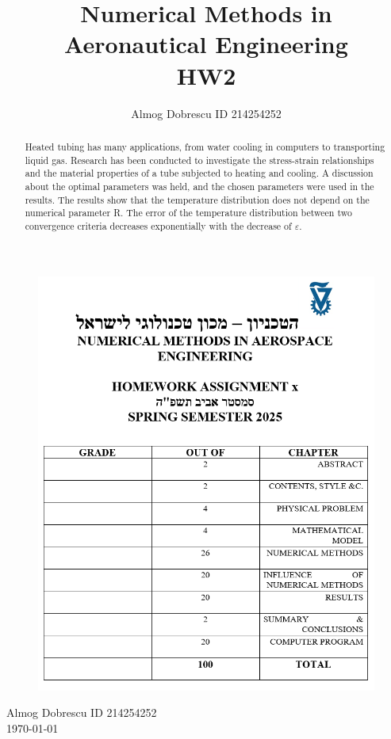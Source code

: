 \documentclass[11pt, a4paper]{article}
\title{Numerical Methods in Aeronautical Engineering \\ HW2}
\author{Almog Dobrescu ID 214254252}
\begin{document}
\thispagestyle{empty}
\begin{figure}[H]
    \centering
    \includegraphics[width=\textwidth]{./../../Cover page for computational assignments 2025.png}
    \label{fig: cover page}
\end{figure}
\begin{center}
    \Huge
    Almog Dobrescu \qquad ID 214254252 \\ \vspace{0.5cm}
    \today
\end{center}
\newpage

\begin{abstract}
    Heated tubing has many applications, from water cooling in computers to transporting liquid gas. Research has been conducted to investigate the stress-strain relationships and the material properties of a tube subjected to heating and cooling. A discussion about the optimal parameters was held, and the chosen parameters were used in the results. The results show that the temperature distribution does not depend on the numerical parameter R. The error of the temperature distribution between two convergence criteria decreases exponentially with the decrease of $\varepsilon$.
\end{abstract}
\end{document}
